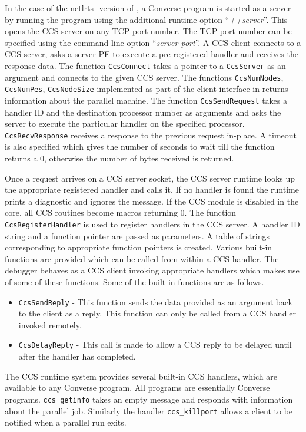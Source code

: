 In the case of the netlrts- version of \charmpp{}, a Converse program
is started as a server by running the \charmpp{} program using the
additional runtime option ``\textit{++server}''. This opens the CCS
server on any TCP port number. The TCP port number can be
specified using the command-line option ``\textit{server-port}''. A
CCS client connects to a CCS server, asks a server PE to execute a
pre-registered handler and receives the response data. The
function \texttt{CcsConnect} takes a pointer to a
\texttt{CcsServer} as an argument and connects to the given CCS
server. The functions \texttt{CcsNumNodes}, \texttt{CcsNumPes},
\texttt{CcsNodeSize} implemented as part of the client interface
in \charmpp{} returns information about the parallel machine. The
function \texttt{CcsSendRequest} takes a handler ID and the
destination processor number as arguments and asks the server to
execute the particular handler on the specified processor.
\texttt{CcsRecvResponse} receives a response to the previous
request in-place. A timeout is also specified which gives the
number of seconds to wait till the function returns a 0, otherwise
the number of bytes received is returned.

Once a request arrives on a CCS server socket, the CCS server
runtime looks up the appropriate registered handler and calls it.
If no handler is found the runtime prints a diagnostic and ignores
the message. If the CCS module is disabled in the core, all CCS
routines become macros returning 0. The function
\texttt{CcsRegisterHandler} is used to register handlers in the
CCS server. A handler ID string and a function pointer are passed
as parameters. A table of strings corresponding to appropriate
function pointers is created. Various built-in functions are
provided which can be called from within a CCS handler. The
debugger behaves as a CCS client invoking appropriate handlers
which makes use of some of these functions. Some of the built-in
functions are as follows.

\begin{itemize}

\item

\texttt{CcsSendReply} - This function sends the data provided as
an argument back to the client as a reply. This function can only
be called from a CCS handler invoked remotely.

\item

\texttt{CcsDelayReply} - This call is made to allow a CCS reply to
be delayed until after the handler has completed.


\end{itemize}

The CCS runtime system provides several built-in CCS handlers,
which are available to any Converse program. All \charmpp{}
programs are essentially Converse programs. \texttt{ccs\_getinfo}
takes an empty message and responds with information about the
parallel job. Similarly the handler \texttt{ccs\_killport} allows
a client to be notified when a parallel run exits.
